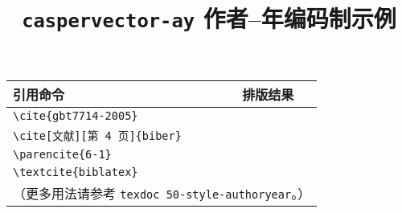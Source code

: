 \documentclass[UTF8]{ctexart}
\begin{document}
\title{\textbf{\texttt{caspervector-ay} 作者--年编码制示例}}
\author{}
\date{}
\maketitle
\vspace*{-1em}

\begin{center}
\begin{tabular}{ll}
\hline
引用命令 &	排版结果 \\\hline
\verb|\cite{gbt7714-2005}| &	\cite{gbt7714-2005} \\
\verb|\cite[文献][第 4 页]{biber}| &	\cite[文献][第 4 页]{biber} \\
\verb|\parencite{6-1}| &	\parencite{6-1} \\
\verb|\textcite{biblatex}| &	\textcite{biblatex} \\\hline
\multicolumn{2}{l}{（更多用法请参考 \texttt{texdoc 50-style-authoryear}。）} \\
\end{tabular}
\end{center}
\vspace*{1em}

\printbibliography
\nocite{*}
\end{document}
